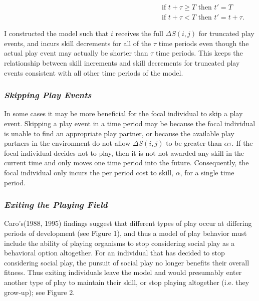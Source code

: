 \documentclass[12pt,letterpaper]{article}
\begin{document}
	
	~~~~~~~~~~~~~~~~~~~~~~~~~~~~~~~~~~~~~~~~~~~~~if $t+\tau \ge T$ then $t'=T$ \\ 
	\indent ~~~~~~~~~~~~~~~~~~~~~~~~~~~~~~~~~~~~~~~~~~~~~if $t+\tau < T$ then $t'=t+\tau$.
	
	    
      I constructed the model such that $i$ receives the full $\Delta S(i,j)$ for truncated play events, and incurs skill decrements for all of the $\tau$ time periods even though the actual play event may actually be shorter than $\tau$ time periods. %
      This keeps the relationship between skill increments and skill decrements for truncated play events consistent with all other time periods of the model. 
    
    \subsubsection{\it Skipping Play Events}
      \indent In some cases it may be more beneficial for the focal individual to skip a play event.
      Skipping a play event in a time period may be because the focal individual is unable to find an appropriate play partner, or because the available play partners in the environment do not allow $\Delta S(i,j)$ to be greater than $\alpha \tau$. 
      If the focal individual decides not to play, then it is not not awarded any skill in the current time and only moves one time period into the future. 
      Consequently, the focal individual only incurs the per period cost to skill, $\alpha$, for a single time period.

    \subsubsection{\it Exiting the Playing Field}
      Caro's(1988, 1995) findings suggest that different types of play occur at differing periods of development (see Figure 1), and thus a model of play behavior must include the ability of playing organisms to stop considering social play as a behavioral option altogether.
      For an individual that has decided to stop considering social play, the pursuit of social play no longer benefits their overall fitness.
      Thus exiting individuals leave the model and would presumably enter another type of play to maintain their skill, or stop playing altogether (i.e. they grow-up); see Figure 2.\\ %
\end{document}
